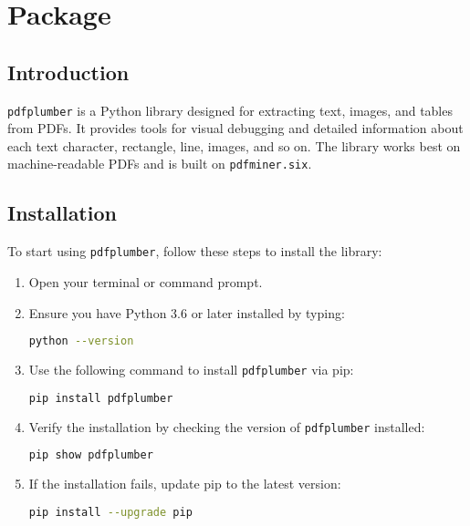 \chapter{Package } 
\label{chap:pdfplumber}

\section{Introduction}
\label{sec:introduction}

\texttt{pdfplumber} is a Python library designed for extracting text, images, and tables from PDFs. It provides tools for visual debugging and detailed information about each text character, rectangle, line, images, and so on. The library works best on machine-readable PDFs and is built on \texttt{pdfminer.six}. \cite{Singer:2022}

\section{Installation}
\label{sec:installation}

To start using \texttt{pdfplumber}, follow these steps to install the library:
\begin{enumerate}
    \item Open your terminal or command prompt.
    \item Ensure you have Python 3.6 or later installed by typing:
    \begin{lstlisting}[language=bash, caption={PDFPlumber Checking Python version.}]
    python --version
    \end{lstlisting}
    \item Use the following command to install \texttt{pdfplumber} via pip:
    \begin{lstlisting}[language=bash, caption={PDFPlumber Installing pdfplumber.}]
    pip install pdfplumber
    \end{lstlisting}
    \item Verify the installation by checking the version of \texttt{pdfplumber} installed:
    \begin{lstlisting}[language=bash, caption={PDFPlumber Verifying installation.}]
    pip show pdfplumber
    \end{lstlisting}
    \item If the installation fails, update pip to the latest version:
    \begin{lstlisting}[language=bash, caption={PDFPlumber Updating pip.}]
    pip install --upgrade pip
    \end{lstlisting}
\end{enumerate}
\newpage
